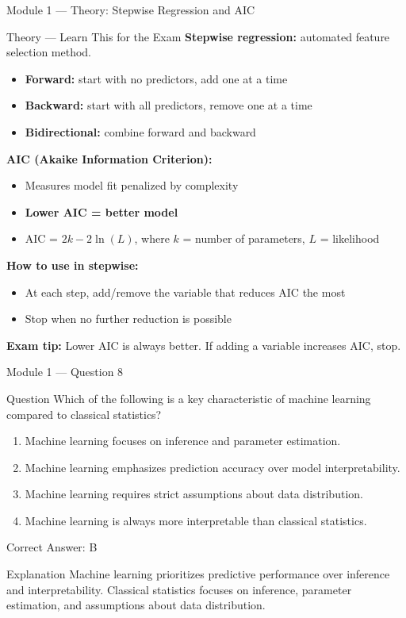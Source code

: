 \documentclass[aspectratio=169,10pt]{beamer}
\newcommand{\question}[1]{%
	\begin{block}{Question}
		#1
	\end{block}
}
\newcommand{\options}[4]{%
	\begin{enumerate}[label=\Alph*.,leftmargin=*]
		\item #1
		\item #2
		\item #3
		\item #4
	\end{enumerate}
}
\newcommand{\answerbox}[1]{%
	\begin{exampleblock}{Correct Answer: #1}
	\end{exampleblock}
}
\newcommand{\explain}[1]{%
	\begin{block}{Explanation}
		\small #1
	\end{block}
}
\newcommand{\theory}[1]{%
	\begin{block}{Theory --- Learn This for the Exam}
		\small #1
	\end{block}
}
\begin{document}
	\begin{frame}{Module 1 --- Theory: Stepwise Regression and AIC}
		\theory{
			\textbf{Stepwise regression:} automated feature selection method.
			\begin{itemize}
				\item \textbf{Forward:} start with no predictors, add one at a time
				\item \textbf{Backward:} start with all predictors, remove one at a time
				\item \textbf{Bidirectional:} combine forward and backward
			\end{itemize}
			\textbf{AIC (Akaike Information Criterion):}
			\begin{itemize}
				\item Measures model fit penalized by complexity
				\item \textbf{Lower AIC = better model}
				\item AIC = $2k - 2\ln(L)$, where $k$ = number of parameters, $L$ = likelihood
			\end{itemize}
			\textbf{How to use in stepwise:}
			\begin{itemize}
				\item At each step, add/remove the variable that reduces AIC the most
				\item Stop when no further reduction is possible
			\end{itemize}
			\textbf{Exam tip:} Lower AIC is always better. If adding a variable increases AIC, stop.
		}
	\end{frame}
	
	\begin{frame}{Module 1 --- Question 8}
		\question{Which of the following is a key characteristic of machine learning compared to classical statistics?}
		\options{Machine learning focuses on inference and parameter estimation.}{Machine learning emphasizes prediction accuracy over model interpretability.}{Machine learning requires strict assumptions about data distribution.}{Machine learning is always more interpretable than classical statistics.}
		\answerbox{B}
		\explain{Machine learning prioritizes predictive performance over inference and interpretability. Classical statistics focuses on inference, parameter estimation, and assumptions about data distribution.}
	\end{frame}
	
\end{document}
